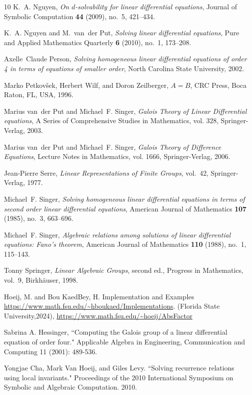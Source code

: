 \documentclass[11pt,reqno]{amsart}
\theoremstyle{definition}
\begin{document}
\begin{thebibliography}{10}
K.~A. Nguyen, \emph{On $d$-solvability for linear differential equations}, Journal of Symbolic Computation \textbf{44} (2009), no.~5, 421--434.

K.~A. Nguyen and M.~van~der Put, \emph{Solving linear differential equations}, Pure and Applied Mathematics Quarterly \textbf{6} (2010), no.~1, 173--208.

Axelle~Claude Person, \emph{Solving homogeneous linear differential equations of order 4 in terms of equations of smaller order}, North Carolina State University, 2002.

Marko Petkov{\v{s}}ek, Herbert Wilf, and Doron Zeilberger, \emph{{$A=B$}}, CRC Press, Boca Raton, FL, USA, 1996.

Marius van~der Put and Michael~F. Singer, \emph{{Galois Theory of Linear Differential equations}}, A Series of Comprehensive Studies in Mathematics, vol. 328, Springer-Verlag, 2003.

Marius van~der Put and Michael~F. Singer, \emph{Galois Theory of Difference Equations}, Lecture Notes in Mathematics, vol. 1666, Springer-Verlag, 2006.

Jean-Pierre Serre, \emph{Linear Representations of Finite Groups}, vol.~42, Springer-Verlag, 1977.

Michael~F. Singer, \emph{Solving homogeneous linear differential equations in terms of second order linear differential equations}, American Journal of Mathematics \textbf{107} (1985), no.~3, 663--696.

Michael~F. Singer, \emph{Algebraic relations among solutions of linear differential equations: Fano's theorem}, American Journal of Mathematics \textbf{110} (1988), no.~1, 115--143.

Tonny Springer, \emph{Linear Algebraic Groups}, second ed., Progress in Mathematics, vol.~9, Birkh\"{a}user, 1998.

 Hoeij, M. and Bou KaedBey, H. Implementation and Examples \url{https://www.math.fsu.edu/~hboukaed/Implementations}. (Florida State University,2024), \url{https://www.math.fsu.edu/~hoeij/AbsFactor}

 Sabrina A. Hessinger, ``Computing the Galois group of a linear differential equation of order four." Applicable Algebra in Engineering, Communication and Computing 11 (2001): 489-536.

 Yongjae Cha, Mark Van Hoeij, and Giles Levy. ``Solving recurrence relations using local invariants." Proceedings of the 2010 International Symposium on Symbolic and Algebraic Computation. 2010.

\end{thebibliography}
\end{document}
